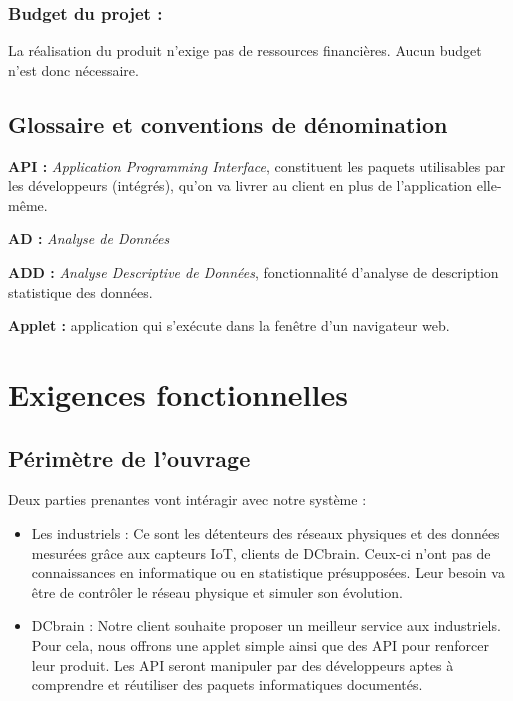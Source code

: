 			\subsubsection{Budget du projet :}
				La réalisation du produit n'exige pas de ressources financières. Aucun budget n'est donc nécessaire.
		
		\subsection{Glossaire et conventions de dénomination}
			\begin{description}[style=unboxed,leftmargin=0.2cm]
			\item\textbf{API :} \textit{Application Programming Interface}, constituent les paquets utilisables par les développeurs (intégrés), qu'on va livrer au client en plus de l'application elle-même.
			\item\textbf{AD :} \textit{Analyse de Données}
			\item\textbf{ADD :} \textit{Analyse Descriptive de Données}, fonctionnalité d'analyse de description statistique des données.
			\item\textbf{Applet :} application qui s'exécute dans la fenêtre d'un navigateur web.
			\end{description}
			
	\section{Exigences fonctionnelles}
	
		\subsection{Périmètre de l'ouvrage}
		
			Deux parties prenantes vont intéragir avec notre système :\\
			\begin{itemize}
			\item Les industriels : Ce sont les détenteurs des réseaux physiques et des données mesurées grâce aux capteurs IoT, clients de DCbrain. Ceux-ci n'ont pas de connaissances en informatique ou en statistique présupposées. Leur besoin va être de contrôler le réseau physique et simuler son évolution.\\
			\item DCbrain : Notre client souhaite proposer un meilleur service aux industriels. Pour cela, nous offrons une applet simple ainsi que des API pour renforcer leur produit. Les API seront manipuler par des développeurs aptes à comprendre et réutiliser des paquets informatiques documentés.
			\end{itemize}
				
